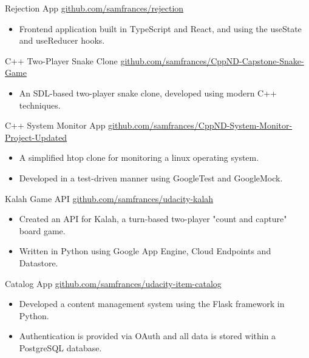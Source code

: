 \documentclass[10pt,a4paper,sans]{moderncv} %
\begin{document}
    { Rejection App}{}{}
    {\href{ https://github.com/samfrances/rejection }{ github.com/samfrances/rejection }}
    {        \begin{itemize}
            \item{Frontend application built in TypeScript and React, and using the useState and useReducer hooks.}
        \end{itemize}
}
    { C++ Two-Player Snake Clone}{}{}
    {\href{ https://github.com/samfrances/CppND-Capstone-Snake-Game }{ github.com/samfrances/CppND-Capstone-Snake-Game }}
    {        \begin{itemize}
            \item{An SDL-based two-player snake clone, developed using modern C++ techniques.}
        \end{itemize}
}
    { C++ System Monitor App}{}{}
    {\href{ https://github.com/samfrances/CppND-System-Monitor-Project-Updated }{ github.com/samfrances/CppND-System-Monitor-Project-Updated }}
    {        \begin{itemize}
            \item{A simplified htop clone for monitoring a linux operating system.}
            \item{Developed in a test-driven manner using GoogleTest and GoogleMock.}
        \end{itemize}
}
    { Kalah Game API}{}{}
    {\href{ http://www.github.com/samfrances/udacity-kalah }{ github.com/samfrances/udacity-kalah }}
    {        \begin{itemize}
            \item{Created an API for Kalah, a turn-based two-player "count and capture" board game.}
            \item{Written in Python using Google App Engine, Cloud Endpoints and Datastore.}
        \end{itemize}
}
    { Catalog App}{}{}
    {\href{ http://github.com/samfrances/udacity-item-catalog }{ github.com/samfrances/udacity-item-catalog }}
    {        \begin{itemize}
            \item{Developed a content management system using the Flask framework in Python.}
            \item{Authentication is provided via OAuth and all data is stored within a PostgreSQL database.}
        \end{itemize}
}
\end{document}
